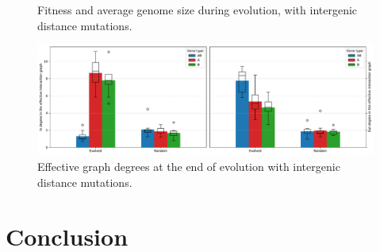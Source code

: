 \begin{figure}
\centering
\begin{elasticrow}[width=\textwidth]
\end{elasticrow}
\caption[Average fitness and intergenic size during evolution, with intergenic distance mutations]{Fitness and average genome size during evolution, with intergenic distance mutations.}
\end{figure}



\begin{figure}
\centering
\includegraphics[width=\textwidth]{param/evolve-intergene/effective_graph_combined_degree.pdf}
\caption{Effective graph degrees at the end of evolution with intergenic distance mutations.}
\end{figure}

\section{Conclusion}

